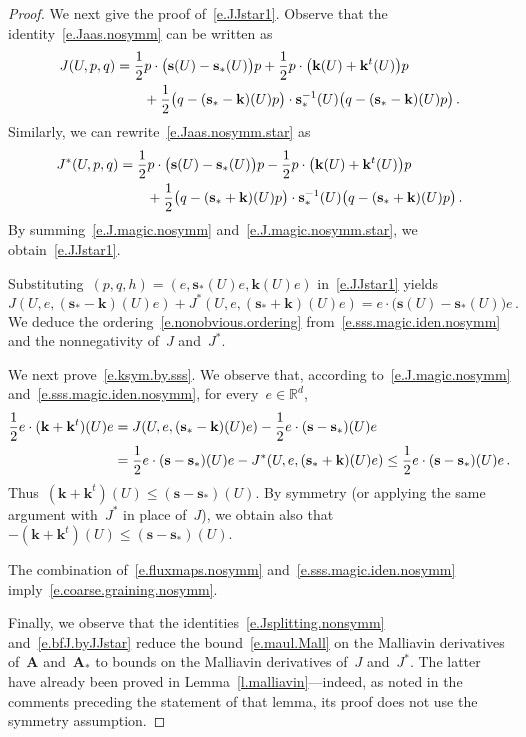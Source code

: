 \documentclass[11pt,twoside]{article} %
\numberwithin{equation}{section}
\theoremstyle{definition}
\newcommand*{\Rd}{\ensuremath{\mathbb{R}^d}}
\newcommand{\s}{\mathbf{s}}
\renewcommand{\k}{\mathbf{k}}
\newcommand{\bfA}{\mathbf{A}}
\begin{document}
\begin{proof}
\smallskip

We next give the proof of~\eqref{e.JJstar1}. 
Observe that the identity~\eqref{e.Jaas.nosymm} can be written as 
\begin{align}
\label{e.J.magic.nosymm}
J(U,p,q) 
& 
=
\frac 12p \cdot \bigl (\s(U)- \s_* (U) \bigr )p 
+
\frac12 p \cdot \bigl( \k(U) + \k^t(U) \bigr) p
\notag \\ & 
\qquad 
+ \frac 12 \bigl (q -(\s_*-\k)(U) p\bigr ) \cdot \s_*^{-1} (U) \bigl (q-(\s_*-\k)(U) p\bigr ) 
\,.
\end{align}
Similarly, we can rewrite~\eqref{e.Jaas.nosymm.star} as 
\begin{align}
\label{e.J.magic.nosymm.star}
J^*(U,p,q) 
& 
=
\frac 12p \cdot \bigl (\s(U)- \s_* (U) \bigr )p 
-
\frac12 p \cdot \bigl( \k(U) + \k^t(U) \bigr) p
\notag \\ & 
\qquad 
+ \frac 12 \bigl (q -(\s_*+\k)(U) p\bigr ) \cdot \s_*^{-1} (U) \bigl (q-(\s_*+\k)(U) p\bigr ) 
\,.
\end{align}
By summing~\eqref{e.J.magic.nosymm} and~\eqref{e.J.magic.nosymm.star}, we obtain~\eqref{e.JJstar1}. 

\smallskip

Substituting~$(p,q,h)=(e,\s_*(U)e,\k(U)e)$ in~\eqref{e.JJstar1} yields
\begin{equation}
\label{e.sss.magic.iden.nosymm}
J(U,e,(\s_*- \k)(U) e) 
+ J^*(U,e,(\s_*+\k)(U) e)
=
e \cdot \bigl( \s(U) - \s_*(U) \bigr) e
\,.
\end{equation}	
We deduce the ordering~\eqref{e.nonobvious.ordering}  from~\eqref{e.sss.magic.iden.nosymm} and the nonnegativity of~$J$ and~$J^*$.

\smallskip

We next prove~\eqref{e.ksym.by.sss}. 
We observe that, according to~\eqref{e.J.magic.nosymm} and~\eqref{e.sss.magic.iden.nosymm}, for every~$e \in \Rd$, 
\begin{align*}
\frac12 e\cdot (\k+\k^t)(U) e 
&
=
J(U,e,(\s_*- \k)(U) e) 
-
\frac12 e\cdot (\s-\s_*)(U) e
\notag \\ & 
=
\frac12 e\cdot (\s-\s_*)(U) e
-
J^*(U,e,(\s_*+\k)(U) e)
\leq 
\frac12 e\cdot (\s-\s_*)(U) e
\,.
\end{align*}
Thus~$(\k+\k^t)(U) \leq (\s-\s_*)(U)$. By symmetry (or applying the same argument with~$J^*$ in place of~$J$), we obtain also that~$-(\k+\k^t)(U) \leq (\s-\s_*)(U)$.

\smallskip

The combination of~\eqref{e.fluxmaps.nosymm} and~\eqref{e.sss.magic.iden.nosymm} imply~\eqref{e.coarse.graining.nosymm}. 

\smallskip

Finally, we observe that the identities~\eqref{e.Jsplitting.nonsymm} and~\eqref{e.bfJ.byJJstar}
reduce the bound~\eqref{e.maul.Mall} on the Malliavin derivatives of~$\bfA$ and~$\bfA_*$ to bounds on the Malliavin derivatives of~$J$ and~$J^*$. The latter have already been proved in Lemma~\ref{l.malliavin}---indeed, as noted in the comments preceding the statement of that lemma, its proof does not use the symmetry assumption. 
\end{proof}
\end{document}

